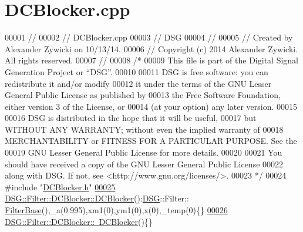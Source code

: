 \hypertarget{_d_c_blocker_8cpp_source}{\section{D\+C\+Blocker.\+cpp}
\label{_d_c_blocker_8cpp_source}
}

\begin{DoxyCode}
00001 \textcolor{comment}{//}
00002 \textcolor{comment}{//  DCBlocker.cpp}
00003 \textcolor{comment}{//  DSG}
00004 \textcolor{comment}{//}
00005 \textcolor{comment}{//  Created by Alexander Zywicki on 10/13/14.}
00006 \textcolor{comment}{//  Copyright (c) 2014 Alexander Zywicki. All rights reserved.}
00007 \textcolor{comment}{//}
00008 \textcolor{comment}{/*}
00009 \textcolor{comment}{ This file is part of the Digital Signal Generation Project or “DSG”.}
00010 \textcolor{comment}{}
00011 \textcolor{comment}{ DSG is free software: you can redistribute it and/or modify}
00012 \textcolor{comment}{ it under the terms of the GNU Lesser General Public License as published by}
00013 \textcolor{comment}{ the Free Software Foundation, either version 3 of the License, or}
00014 \textcolor{comment}{ (at your option) any later version.}
00015 \textcolor{comment}{}
00016 \textcolor{comment}{ DSG is distributed in the hope that it will be useful,}
00017 \textcolor{comment}{ but WITHOUT ANY WARRANTY; without even the implied warranty of}
00018 \textcolor{comment}{ MERCHANTABILITY or FITNESS FOR A PARTICULAR PURPOSE.  See the}
00019 \textcolor{comment}{ GNU Lesser General Public License for more details.}
00020 \textcolor{comment}{}
00021 \textcolor{comment}{ You should have received a copy of the GNU Lesser General Public License}
00022 \textcolor{comment}{ along with DSG.  If not, see <http://www.gnu.org/licenses/>.}
00023 \textcolor{comment}{ */}
00024 \textcolor{preprocessor}{#include "\hyperlink{_d_c_blocker_8h}{DCBlocker.h}"}
\hypertarget{_d_c_blocker_8cpp_source_l00025}{}\hyperlink{class_d_s_g_1_1_filter_1_1_d_c_blocker_a71cb7abe6fca10f64402971d8b4a6eb3}{00025} \hyperlink{class_d_s_g_1_1_filter_1_1_d_c_blocker_a71cb7abe6fca10f64402971d8b4a6eb3}{DSG::Filter::DCBlocker::DCBlocker}():\hyperlink{namespace_d_s_g}{DSG}::Filter::
      \hyperlink{class_d_s_g_1_1_filter_1_1_filter_base}{FilterBase}(),\_a(0.995),xm1(0),ym1(0),x(0),\_temp(0)\{\}
\hypertarget{_d_c_blocker_8cpp_source_l00026}{}\hyperlink{class_d_s_g_1_1_filter_1_1_d_c_blocker_a5393dac29a226f5912f6d1705b69eecf}{00026} \hyperlink{class_d_s_g_1_1_filter_1_1_d_c_blocker_a5393dac29a226f5912f6d1705b69eecf}{DSG::Filter::DCBlocker::~DCBlocker}()\{\}
\end{DoxyCode}
